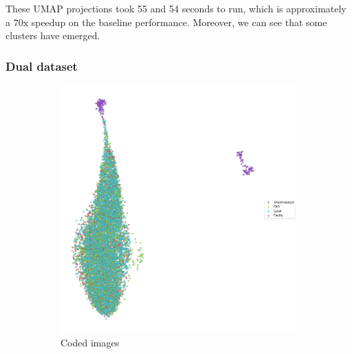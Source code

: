 These UMAP projections took 55 and 54 seconds to run, which is approximately a 70x speedup on the baseline performance. Moreover, we can see that some clusters have emerged.

\bigskip
\subsubsection{Dual dataset}
\hfill
\hfill

\begin{figure}[h!]
    \centering
    \begin{subfigure}[h!]{0.45\textwidth}
        \includegraphics[width=\textwidth]{dissertation/figures/CK19_baseline_visualisation.png}
        \caption{Coded images}
    \end{subfigure}
    \begin{subfigure}[h!]{0.45\textwidth}

\end{subfigure}
\end{figure}
